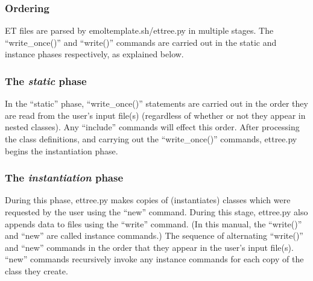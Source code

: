 \documentclass[11pt]{article}
\begin{document}
\subsubsection*{Ordering}

ET files are parsed by emoltemplate.sh/ettree.py
in multiple stages.
The ``write\_once()'' and ``write()'' commands are carried out 
in the static and instance phases respectively, as explained below.

\subsubsection*{The \textit{static} phase}

In the ``static'' phase,
``write\_once()'' statements are carried out in the order they are read 
from the user's input file(s)
(regardless of whether or not they appear in nested classes).
Any ``include'' commands will effect this order. 
After processing the class definitions, and carrying out 
the ``write\_once()'' commands,
ettree.py begins the instantiation phase.

\subsubsection*{The \textit{instantiation} phase}

During this phase, ettree.py makes copies of (instantiates) classes 
which were requested by the user using the ``new'' command.
During this stage, ettree.py also appends data 
to files using the ``write'' command.
(In this manual, the ``write()'' and ``new'' are called instance commands.)
The sequence of alternating ``write()'' and ``new'' commands in the 
order that they appear in the user's input file(s).
``new'' commands recursively invoke any instance commands for each 
copy of the class they create.
\end{document}
